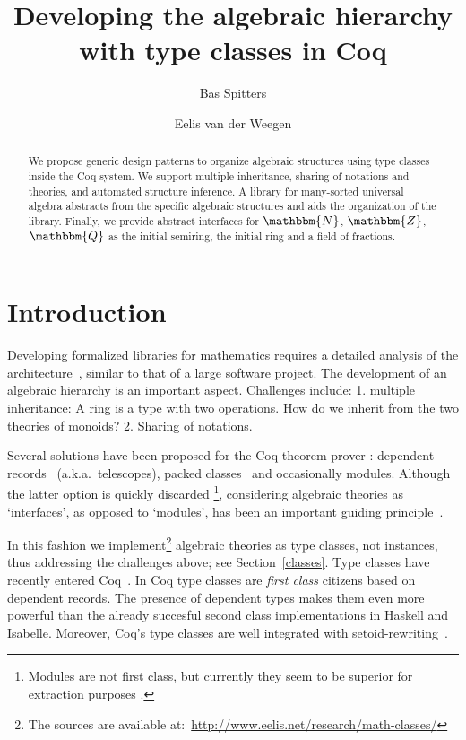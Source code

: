 \documentclass[a4paper,10pt]{llncs}
\newcommand{\N}{\ensuremath{\mathbbm{N}}}
\newcommand{\Z}{\ensuremath{\mathbbm{Z}}}
\newcommand{\Q}{\ensuremath{\mathbbm{Q}}}
\begin{document}
\title{Developing the algebraic hierarchy with type classes in Coq}
\author{Bas Spitters \and Eelis van der Weegen}
\maketitle
\begin{abstract}
We propose generic design patterns to organize algebraic structures using type classes inside the
Coq system. We support multiple inheritance, sharing of notations and theories, and automated
structure inference. A library for many-sorted universal algebra abstracts from the specific
algebraic structures and aids the organization of the library. Finally, we provide abstract
interfaces for $\N$, $\Z$, $\Q$ as the initial semiring, the initial ring and a field of
fractions.
\end{abstract}

\section{Introduction}
Developing formalized libraries for mathematics requires a detailed analysis of the architecture~\cite{C-corn,DBLP:conf/types/HaftmannW08}, similar to that of a large software project. 
The development of an algebraic hierarchy is an important aspect. Challenges include: 1. multiple
inheritance: A ring is a type with two operations. How do we inherit from the two theories of
monoids? 2. Sharing of notations. 

Several solutions have been proposed for the Coq theorem prover%
: dependent
records~\cite{DBLP:journals/jsc/GeuversPWZ02} (a.k.a.\ telescopes), packed classes~\cite{Packed} and
occasionally modules. Although the latter option is quickly discarded%
\footnote{Modules are not first class, but currently they seem to be superior for extraction
purposes%
.}, considering
algebraic theories as `interfaces', as opposed to `modules', has been an important
guiding principle~\cite{Packed}.

In this fashion we implement\footnote{The sources are available at:~\url{http://www.eelis.net/research/math-classes/}}%
 algebraic theories as type classes, not instances, thus addressing the
challenges above; see Section~\ref{classes}. Type classes have recently entered Coq~\cite{DBLP:conf/tphol/SozeauO08}. In Coq
type classes are \emph{first class} citizens based on dependent records. The presence of dependent types makes them even more
powerful than the already succesful second class implementations in Haskell and Isabelle. Moreover,
Coq's type classes are well integrated with setoid-rewriting~\cite{Setoid-rewrite}.
\end{document}
